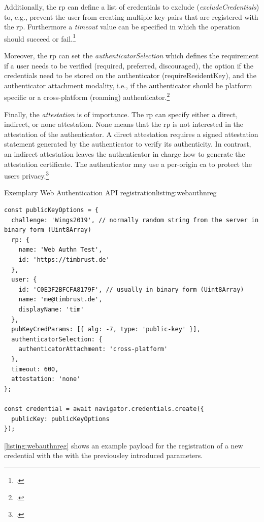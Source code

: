 Additionally, the \gls{rp} can define a list of credentials to exclude (\textit{excludeCredentials}) to, e.g., prevent the user from creating multiple key-pairs that are registered with the \gls{rp}. Furthermore a \textit{timeout} value can be specified in which the operation should succeed or fail.\footcites[See][Chapter 5.4]{w3c}

Moreover, the \gls{rp} can set the \textit{authenticatorSelection} which defines the requirement if a user needs to be verified (\frqq required\flqq, \frqq preferred\flqq, \frqq discouraged\flqq), the option if the credentials need to be stored on the authenticator (\frqq requireResidentKey\flqq), and the authenticator attachment modality, i.e., if the authenticator should be platform specific or a cross-platform (roaming) authenticator.\footcites[See][Chapter 6.2.1]{w3c}

Finally, the \textit{attestation} is of importance. The \gls{rp} can specify either a direct, indirect, or none attestation. None means that the \gls{rp} is not interested in the attestation of the authenticator. A direct attestation requires a signed attestation statement generated by the authenticator to verify its authenticity. In contrast, an indirect attestation leaves the authenticator in charge how to generate the attestation certificate. The authenticator may use a per-origin \gls{ca} to protect the users privacy.\footcites[See][Chapter 5.4.6]{w3c}

\begin{example}{Exemplary Web Authentication API registration}{listing:webauthnreg}
\begin{verbatim}
const publicKeyOptions = {
  challenge: 'Wings2019', // normally random string from the server in binary form (Uint8Array)
  rp: {
    name: 'Web Authn Test',
    id: 'https://timbrust.de'
  },
  user: {
    id: 'C0E3F2BFCFA8179F', // usually in binary form (Uint8Array)
    name: 'me@timbrust.de',
    displayName: 'tim'
  },
  pubKeyCredParams: [{ alg: -7, type: 'public-key' }],
  authenticatorSelection: {
    authenticatorAttachment: 'cross-platform'
  },
  timeout: 600,
  attestation: 'none'
};

const credential = await navigator.credentials.create({
  publicKey: publicKeyOptions
});
\end{verbatim}
\end{example}

\autoref{listing:webauthnreg} shows an example payload for the registration of a new credential with the \wa{} with the previousley introduced parameters. 

